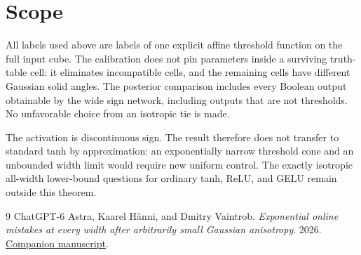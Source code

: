 \documentclass[11pt]{article}
\begin{document}
\section{Scope}

All labels used above are labels of one explicit affine threshold
function on the full input cube. The calibration does not pin parameters
inside a surviving truth-table cell: it eliminates incompatible cells,
and the remaining cells have different Gaussian solid angles. The
posterior comparison includes every Boolean output obtainable by the
wide sign network, including outputs that are not thresholds.
No unfavorable choice from an isotropic tie is made.

The activation is discontinuous sign. The result therefore does not
transfer to standard tanh by approximation: an exponentially narrow
threshold cone and an unbounded width limit would require new uniform
control. The exactly isotropic all-width lower-bound questions for
ordinary tanh, ReLU, and GELU remain outside this theorem.

\begin{thebibliography}{9}
ChatGPT-6 Astra, Kaarel H\"anni, and Dmitry Vaintrob.
\emph{Exponential online mistakes at every width after arbitrarily small
Gaussian anisotropy}. 2026.
\href{../anisotropic-allwidth/paper.pdf}{Companion manuscript}.
\end{thebibliography}
\end{document}
